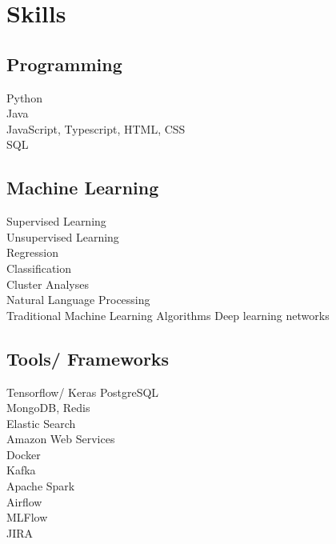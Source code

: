\documentclass[letterpaper]{deedy-resume} %
\begin{document}
\begin{minipage}[t]{0.33\textwidth} %


\section{Skills}
\subsection{Programming}
Python \\
Java \\
JavaScript, Typescript, HTML, CSS\\
SQL \\

\sectionspace %

\subsection{Machine Learning}
Supervised Learning \\
Unsupervised Learning \\
Regression \\
Classification \\
Cluster Analyses \\
Natural Language Processing \\
Traditional Machine Learning Algorithms
Deep learning networks\\

\sectionspace %

\subsection{Tools/ Frameworks}
Tensorflow/ Keras
PostgreSQL \\
MongoDB, Redis \\
Elastic Search \\
Amazon Web Services \\
Docker \\
Kafka \\
Apache Spark\\
Airflow \\
MLFlow \\
JIRA\\



\end{minipage}
\end{document}
